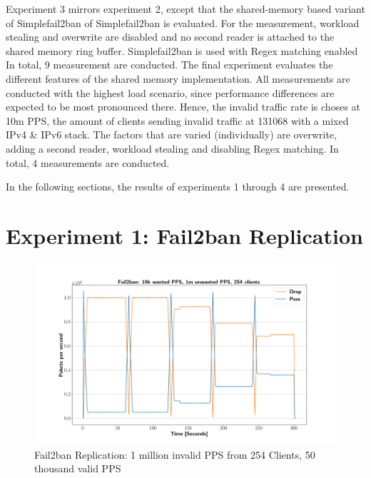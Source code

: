 Experiment 3 mirrors experiment 2, except that the shared-memory based variant of Simplefail2ban of Simplefail2ban is evaluated. For the
measurement, workload stealing and overwrite are disabled and no second reader is attached to the shared memory ring buffer. Simplefail2ban is used with \ac{Regex} matching enabled In total, 9 measurement are conducted.    
The final experiment evaluates the different features of the shared memory implementation. All measurements are conducted with the highest load scenario, since performance 
differences are expected to be most pronounced there. Hence, the invalid traffic rate is choses at 10m \ac{PPS}, the amount of clients sending invalid traffic at 131068
with a mixed \ac{IPv4} \& \ac{IPv6} stack. The factors that are varied (individually) are overwrite, adding a second reader, workload stealing and disabling \ac{Regex} matching.
In total, 4 measurements are conducted.    
\par
In the following sections, the results of experiments 1 through 4 are presented.

\pagebreak

\section{Experiment 1: Fail2ban Replication}

\begin{figure}[h!]
    \centerline{\includegraphics[width=1.2\textwidth]{images/fail2ban_v50k_iv1m_c254.png}}
    \caption[Fail2ban Replication: 1m PPS, 254 Clients]{Fail2ban Replication: 1 million invalid \ac{PPS} from 254 Clients, 50 thousand valid \ac{PPS}}
	\label{fig:fail2ban:1m}
\end{figure}

